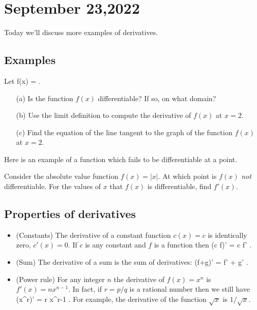 \documentclass[11pt]{amsart}
\begin{document}
\newpage

\section{September 23,2022}

Today we'll discuss more examples of derivatives. 

\subsection*{Examples}

\begin{eg}
Let 
\beqn
f(x) =  .
\eeqn
\begin{itemize}
\item[(a)] Is the function $f(x)$ differentiable? If so, on what domain?
\item[(b)]
Use the limit definition to compute the derivative of $f(x)$ at $x=2$.
\item[(c)] 
Find the equation of the line tangent to the graph of the function $f(x)$ at $x=2$.
\end{itemize}
\end{eg}

\newpage

Here is an example of a function which fails to be differentiable at a point.

\begin{eg} Consider the absolute value function $f(x) = |x|$. 
At which point is $f(x)$ {\em not} differentiable. 
For the values of $x$ that $f(x)$ is differentiable, find $f'(x)$. 
\end{eg}

\vspace{3cm}

\subsection*{Properties of derivatives}

\begin{itemize}
\item (Constants) The derivative of a constant function $c(x) = c$ is identically zero, $c'(x) = 0$. 
If $c$ is any constant and $f$ is a function then
\beqn
(c f)' = c f' .
\eeqn
\item (Sum) The derivative of a sum is the sum of derivatives:
\beqn
(f+g)' = f' + g' .
\eeqn
\item (Power rule) For any integer $n$ the derivative of $f(x) = x^n$ is $f'(x) = n x^{n-1}$. 
In fact, if $r = p/q$ is a rational number then we still have
\beqn
(x^r)' = r x^{r-1} .
\eeqn
For example, the derivative of the function $\sqrt{x}$ is $1 / \sqrt{x}$.
\end{itemize}
\end{document}
